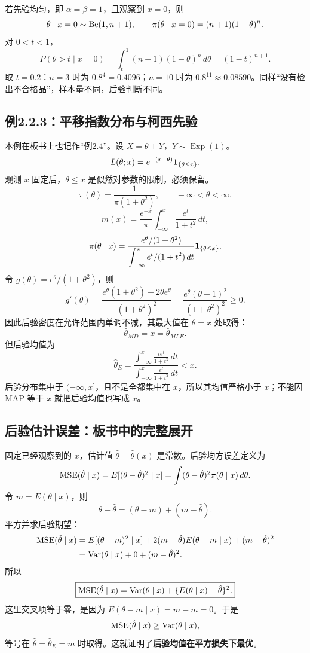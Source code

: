 若先验均匀，即 $\alpha=\beta=1$，且观察到 $x=0$，则
\[
\theta\mid x=0\sim\operatorname{Be}(1,n+1),\qquad
\pi(\theta\mid x=0)=(n+1)(1-\theta)^n.
\]
对 $0<t<1$，
\[
P(\theta>t\mid x=0)=\int_t^1(n+1)(1-\theta)^n\,d\theta=(1-t)^{n+1}.
\]
取 $t=0.2$：$n=3$ 时为 $0.8^4=0.4096$；$n=10$ 时为 $0.8^{11}\approx0.08590$。同样“没有检出不合格品”，样本量不同，后验判断不同。

\subsection{例2.2.3：平移指数分布与柯西先验}
本例在板书上也记作“例2.4”。设 $X=\theta+Y$，$Y\sim\operatorname{Exp}(1)$。
\[
L(\theta;x)=e^{-(x-\theta)}\mathbf{1}_{\{\theta\leq x\}}.
\]
观测 $x$ 固定后，$\theta\leq x$ 是似然对参数的限制，必须保留。
\[
\pi(\theta)=\frac1{\pi(1+\theta^2)},\qquad-\infty<\theta<\infty.
\]
\[
m(x)=\frac{e^{-x}}\pi\int_{-\infty}^x\frac{e^t}{1+t^2}\,dt,
\]
\[
\pi(\theta\mid x)=
\frac{e^\theta/(1+\theta^2)}{\displaystyle\int_{-\infty}^x e^t/(1+t^2)\,dt}
\mathbf{1}_{\{\theta\leq x\}}.
\]
令 $g(\theta)=e^\theta/(1+\theta^2)$，则
\[
g'(\theta)=\frac{e^\theta(1+\theta^2)-2\theta e^\theta}{(1+\theta^2)^2}
=\frac{e^\theta(\theta-1)^2}{(1+\theta^2)^2}\geq0.
\]
因此后验密度在允许范围内单调不减，其最大值在 $\theta=x$ 处取得：
\[
\boxed{\hat\theta_{MD}=x=\hat\theta_{MLE}.}
\]
但后验均值为
\[
\hat\theta_E=
\frac{\displaystyle\int_{-\infty}^x\frac{t e^t}{1+t^2}\,dt}
{\displaystyle\int_{-\infty}^x\frac{e^t}{1+t^2}\,dt}<x.
\]
后验分布集中于 $(-\infty,x]$，且不是全都集中在 $x$，所以其均值严格小于 $x$；不能因 MAP 等于 $x$ 就把后验均值也写成 $x$。

\subsection{后验估计误差：板书中的完整展开}
固定已经观察到的 $x$，估计值 $\hat\theta=\hat\theta(x)$ 是常数。后验均方误差定义为
\[
\operatorname{MSE}(\hat\theta\mid x)=E[(\theta-\hat\theta)^2\mid x]
=\int(\theta-\hat\theta)^2\pi(\theta\mid x)\,d\theta.
\]
令 $m=E(\theta\mid x)$，则
\[
\theta-\hat\theta=(\theta-m)+(m-\hat\theta).
\]
平方并求后验期望：
\begin{align*}
\operatorname{MSE}(\hat\theta\mid x)
&=E[(\theta-m)^2\mid x]
+2(m-\hat\theta)E(\theta-m\mid x)+(m-\hat\theta)^2\\
&=\operatorname{Var}(\theta\mid x)+0+(m-\hat\theta)^2.
\end{align*}
所以
\[
\boxed{\operatorname{MSE}(\hat\theta\mid x)=\operatorname{Var}(\theta\mid x)
+\{E(\theta\mid x)-\hat\theta\}^2.}
\]
这里交叉项等于零，是因为 $E(\theta-m\mid x)=m-m=0$。于是
\[
\operatorname{MSE}(\hat\theta\mid x)\geq\operatorname{Var}(\theta\mid x),
\]
等号在 $\hat\theta=\hat\theta_E=m$ 时取得。这就证明了\textbf{后验均值在平方损失下最优}。

